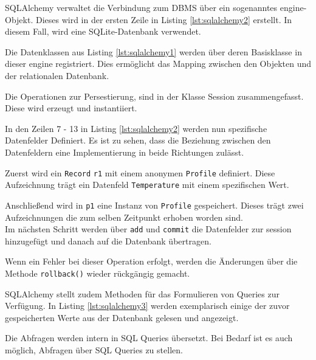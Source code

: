     
        
    SQLAlchemy verwaltet die Verbindung zum DBMS über ein sogenanntes engine-Objekt. Dieses wird in der ersten Zeile in Listing \ref{lst:sqlalchemy2} erstellt. In diesem Fall, wird eine SQLite-Datenbank verwendet.
    
    Die Datenklassen aus Listing \ref{lst:sqlalchemy1} werden über deren Basisklasse in dieser engine registriert. Dies ermöglicht das Mapping zwischen den Objekten und der relationalen Datenbank.
    
    Die Operationen zur Persestierung, sind in der Klasse Session zusammengefasst. Diese wird erzeugt und instantiiert. 
    
    In den Zeilen 7 - 13 in Listing \ref{lst:sqlalchemy2} werden nun spezifische Datenfelder Definiert. Es ist zu sehen, dass die Beziehung zwischen den Datenfeldern eine Implementierung in beide Richtungen zulässt.
    
    Zuerst wird ein \texttt{Record} \texttt{r1} mit einem anonymen \texttt{Profile} definiert. Diese Aufzeichnung trägt ein Datenfeld \texttt{Temperature} mit einem spezifischen Wert.
    
    Anschließend wird in \texttt{p1} eine Instanz von \texttt{Profile} gespeichert. Dieses trägt zwei Aufzeichnungen die zum selben Zeitpunkt erhoben worden sind.
    \\
    
    Im nächsten Schritt werden über \texttt{add} und \texttt{commit} die Datenfelder zur session hinzugefügt und danach auf die Datenbank übertragen.
    
    Wenn ein Fehler bei dieser Operation erfolgt, werden die Änderungen über die Methode \texttt{rollback()} wieder rückgängig gemacht.

    
    
    
    SQLAlchemy stellt zudem Methoden für das Formulieren von Queries zur Verfügung. In Listing \ref{lst:sqlalchemy3} werden exemplarisch einige der zuvor gespeicherten Werte aus der Datenbank gelesen und angezeigt.
    
    Die Abfragen werden intern in SQL Queries übersetzt. Bei Bedarf ist es auch möglich, Abfragen über SQL Queries zu stellen.
    
    
    
    
